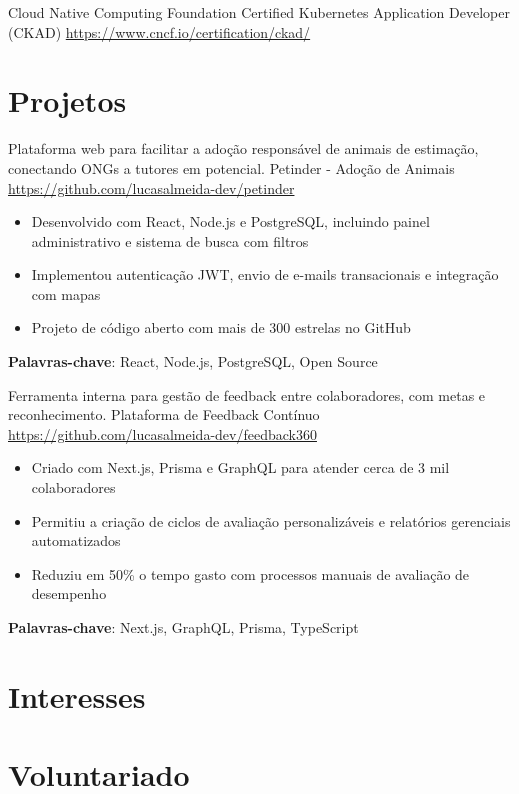 \documentclass[a4paper, serif, 10pt]{moderncv}
\begin{document}
        {Cloud Native Computing Foundation}
        {Certified Kubernetes Application Developer (CKAD)}
        {\url{https://www.cncf.io/certification/ckad/}}
        {}
        {}
\section{Projetos}

        {Plataforma web para facilitar a adoção responsável de animais de estimação, conectando ONGs a tutores em potencial.}
        {Petinder - Adoção de Animais}
        {\url{https://github.com/lucasalmeida-dev/petinder}}
        {}
        {\begin{itemize}
\item Desenvolvido com React, Node.js e PostgreSQL, incluindo painel administrativo e sistema de busca com filtros
\item Implementou autenticação JWT, envio de e-mails transacionais e integração com mapas
\item Projeto de código aberto com mais de 300 estrelas no GitHub
\end{itemize}
\textbf{Palavras-chave}: React, Node.js, PostgreSQL, Open Source}

        {Ferramenta interna para gestão de feedback entre colaboradores, com metas e reconhecimento.}
        {Plataforma de Feedback Contínuo}
        {\url{https://github.com/lucasalmeida-dev/feedback360}}
        {}
        {\begin{itemize}
\item Criado com Next.js, Prisma e GraphQL para atender cerca de 3 mil colaboradores
\item Permitiu a criação de ciclos de avaliação personalizáveis e relatórios gerenciais automatizados
\item Reduziu em 50\% o tempo gasto com processos manuais de avaliação de desempenho
\end{itemize}
\textbf{Palavras-chave}: Next.js, GraphQL, Prisma, TypeScript}
\section{Interesses}

\section{Voluntariado}
\end{document}
